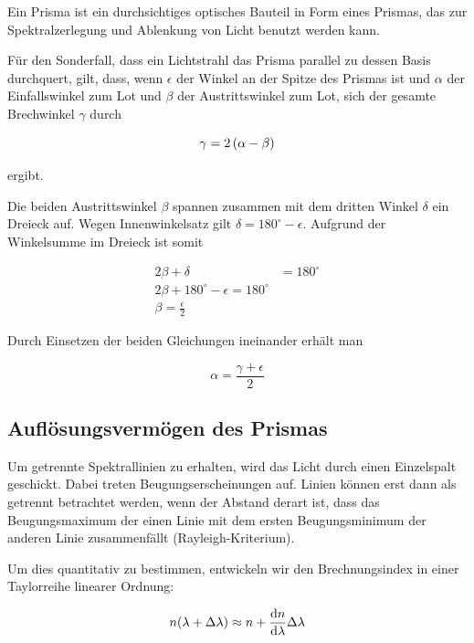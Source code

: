 \documentclass[a4paper,german,12pt,smallheadings]{scrartcl}
\begin{document}
Ein Prisma ist ein durchsichtiges optisches Bauteil in Form eines Prismas, das
zur Spektralzerlegung und Ablenkung von Licht benutzt werden kann.

Für den Sonderfall, dass ein Lichtstrahl das Prisma parallel zu dessen Basis
durchquert, gilt, dass, wenn $\epsilon$ der Winkel an der Spitze des Prismas ist und
$\alpha$ der Einfallswinkel zum Lot und $\beta$ der Austrittswinkel zum Lot,
sich der gesamte Brechwinkel $\gamma$ durch

\begin{equation}
  \gamma = 2 \del{\alpha - \beta}
\end{equation}

ergibt.

Die beiden Austrittswinkel $\beta$ spannen zusammen mit dem dritten Winkel
$\delta$ ein Dreieck auf. Wegen Innenwinkelsatz gilt $\delta = 180^\circ -
\epsilon$. Aufgrund der Winkelsumme im Dreieck ist somit

\begin{align*}
  2 \beta + \delta &= 180^\circ \\
  2 \beta + 180^\circ - \epsilon = 180^\circ \\
  \beta = \frac{\epsilon}{2}
\end{align*}

Durch Einsetzen der beiden Gleichungen ineinander erhält man

\begin{equation}
  \alpha = \frac{\gamma + \epsilon}{2}
\end{equation}

\subsection{Auflösungsvermögen des Prismas}

Um getrennte Spektrallinien zu erhalten, wird das Licht durch einen Einzelspalt
geschickt. Dabei treten Beugungserscheinungen auf. Linien können erst dann als
getrennt betrachtet werden, wenn der Abstand derart ist, dass das
Beugungsmaximum der einen Linie mit dem ersten Beugungsminimum der anderen
Linie zusammenfällt (Rayleigh-Kriterium).

Um dies quantitativ zu bestimmen, entwickeln wir den Brechnungsindex in einer
Taylorreihe linearer Ordnung:

\begin{equation}
  n(\lambda + \Delta \lambda) \approx n + \frac{\dif n}{\dif \lambda} \Delta \lambda
\end{equation}
\end{document}
